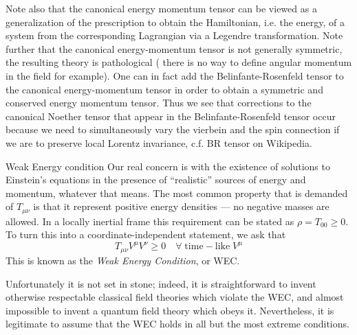 Note also that the canonical energy momentum tensor can be viewed as a generalization of the prescription to obtain the Hamiltonian, i.e. the energy, of a system from the corresponding Lagrangian via a Legendre transformation. Note further that the canonical energy-momentum tensor is not generally symmetric, the resulting theory is pathological ( there is no way to define angular momentum in the field for example). One can in fact add the Belinfante-Rosenfeld tensor to the canonical energy-momentum tensor in order to obtain a symmetric and conserved energy momentum tensor. Thus we see that corrections to the canonical Noether tensor that appear in the Belinfante-Rosenfeld tensor occur because we need to simultaneously vary the vierbein and the spin connection if we are to preserve local Lorentz invariance, c.f. BR tensor on Wikipedia.
\begin{mybox}{Weak Energy condition}
	Our real concern is with the
	existence of solutions to Einstein’s equations in the presence of “realistic” sources of energy
	and momentum, whatever that means. The most common property that is demanded of
	$T_{μν}$ is that it represent positive energy densities — no negative masses are allowed. In a
	locally inertial frame this requirement can be stated as $ρ = T_{00} ≥ 0$. To turn this into a coordinate-independent statement, we ask that
	\begin{equation}
	T_{\mu \nu} V^{\mu} V^{\nu} \geq 0 \quad \forall \; \mathrm{time-like} \; V^\mu
	\end{equation}
	This is known as the \emph{Weak Energy Condition}, or WEC.
\end{mybox}
Unfortunately it is not set in stone; indeed, it is straightforward to invent
otherwise respectable classical field theories which violate the WEC, and almost impossible
to invent a quantum field theory which obeys it. Nevertheless, it is legitimate to assume
that the WEC holds in all but the most extreme conditions.

